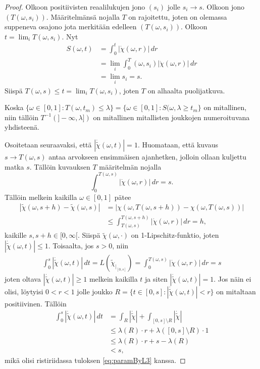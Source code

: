 \documentclass[12pt,oneside,a4paper]{amsbook} %
\begin{document}
\begin{proof}
    Olkoon positiivisten reaalilukujen jono $(s_i)$ jolle $s_i \to s$. Olkoon jono $(T(\omega, s_i))$. Määritelmänsä nojalla $T$ on rajoitettu, joten on olemassa suppeneva osajono jota merkitään edelleen $(T(\omega, s_i))$. Olkoon $t = \lim_i T(\omega, s_i)$. Nyt
    \begin{align*}
        S(\omega, t) &= \int_0^t |\dot\chi(\omega, r)| \, dr \\
        &= \lim_i\int_0^T(\omega, s_i) |\dot\chi(\omega, r)| \, dr \\
        &= \lim_i s_i = s.
    \end{align*}
    Siispä $T(\omega, s) \le t = \lim_i T(\omega, s_i)$, joten $T$ on alhaalta puolijatkuva.
    
    Koska $\{\omega \in [0, 1] : T(\omega, t_m) \le \lambda\} = \{\omega\in [0, 1] : S(\omega, \lambda \ge t_m\}$ on mitallinen, niin tällöin $T^{-1}(]-\infty, \lambda])$ on mitallinen mitallisten joukkojen numeroituvana yhdisteenä.
    
    Osoitetaan seuraavaksi, että $|\dot{\tilde{\chi}}(\omega, t)| = 1$. Huomataan, että kuvaus $s\to T(\omega, s)$ antaa arvokseen ensimmäisen ajanhetken, jolloin ollaan kuljettu matka $s$. Tällöin kuvauksen $T$ määritelmän nojalla 
    \begin{equation} \label{eq:paramByL1}
        \int_0^{T(\omega,s)} |\dot \chi(\omega, r)| \, dr = s.
    \end{equation}
    Tällöin melkein kaikilla $\omega \in [0, 1]$ pätee
    \begin{align*}
        |\tilde\chi(\omega, s + h) - \tilde\chi(\omega, s)| &= |\chi(\omega, T(\omega, s+h)) - \chi(\omega, T(\omega, s))| \\
        &\le \int_{T(\omega,s)}^{T(\omega, s+h)}|\dot \chi(\omega, r)| \, dr = h,
    \end{align*}
    kaikille $s, s+h \in [0, \infty[$. Siispä $\tilde \chi(\omega, \cdot)$ on 1-Lipschitz-funktio, joten $|\dot{\tilde \chi}(\omega, t)| \le 1$. Toisaalta, jos $s > 0$, niin
    \begin{align}
        \label{eq:paramByL3} \int_0^s |\dot{\tilde \chi}(\omega, t)| \, dt = L(\tilde\chi_{|_{[0, s]}})= \int_0^{T(\omega, s)} |\dot \chi(\omega, r)| \, dr = s
    \end{align}
    joten oltava $|\dot{\tilde \chi}(\omega, t)| \ge 1$ melkein kaikilla $t$ ja siten $|\dot{\tilde \chi}(\omega, t)| = 1$. Jos näin ei olisi, löytyisi $0 < r < 1$ jolle joukko $R = \{t \in [0, s] : |\dot{\tilde \chi}(\omega, t)|< r\}$ on mitaltaan positiivinen. Tällöin
    \begin{align*}
        \int_0^s |\dot{\tilde \chi}(\omega, t)| \, dt &= \int_R |\dot{\tilde \chi}| + \int_{[0,s]\setminus R} |\dot{\tilde \chi}| \\
        &\le \lambda(R) \cdot r + \lambda([0,s]\setminus R) \cdot 1 \\
        &\le \lambda(R) \cdot r + s - \lambda(R) \\
        &< s,
    \end{align*}
    mikä olisi ristiriidassa tuloksen \eqref{eq:paramByL3} kanssa.


\end{proof}
\end{document}
